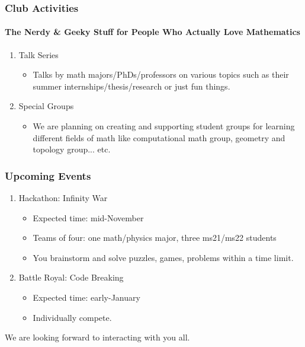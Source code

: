 \documentclass[10pt, aspectratio=43,leqno]{beamer}
\begin{document}
\begin{frame}
  \frametitle{Club Activities}
  \framesubtitle{The Nerdy \& Geeky Stuff for People Who Actually Love Mathematics}
  \pause
\begin{enumerate}
\item\label{item:6} Talk Series
\begin{itemize}
\item Talks by math majors/PhDs/professors on various topics such as their summer internships/thesis/research or just fun things.
\end{itemize}
\pause 
\item\label{item:7} Special Groups
\begin{itemize}
\item We are planning on creating and supporting student groups for learning different fields of math like computational math group, geometry and topology group... etc.
\end{itemize}
\end{enumerate}
\end{frame}

\begin{frame}
  \frametitle{Upcoming Events}
  \pause
\begin{enumerate}
\item\label{item:8} Hackathon: Infinity War 
\begin{itemize}
\item Expected time: mid-November 
\item Teams of four: one math/physics major, three ms21/ms22 students
\item You brainstorm and solve puzzles, games, problems within a time limit.
\end{itemize}
\pause
\item\label{item:9} Battle Royal: Code Breaking 
\begin{itemize} 
\item Expected time: early-January
\item Individually compete.
\end{itemize}
\end{enumerate}
\end{frame}

\begin{frame}
  We are looking forward to interacting with you all.
\end{frame}
\end{document}

